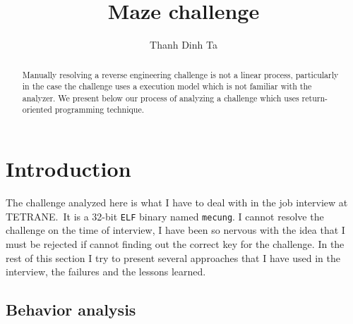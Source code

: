\documentclass{easychair}
\begin{document}
\title{Maze challenge}

\author{
  Thanh Dinh Ta
}



\clearpage
\maketitle

\begin{abstract}
  Manually resolving a reverse engineering challenge is not a linear process, particularly in the case the challenge uses a execution model which is not familiar with the analyzer. We present below our process of analyzing a challenge which uses return-oriented programming technique.
\end{abstract}

\section{Introduction}
\label{sec:introduction}

The challenge analyzed here is what I have to deal with in the job interview at TETRANE.~It is a 32-bit \texttt{ELF} binary named \texttt{mecung}. I cannot resolve the challenge on the time of interview, I have been so nervous with the idea that I must be rejected if cannot finding out the correct key for the challenge. In the rest of this section I try to present several approaches that I have used in the interview, the failures and the lessons learned.


\subsection{Behavior analysis}
\label{sec:work_around}
\end{document}
